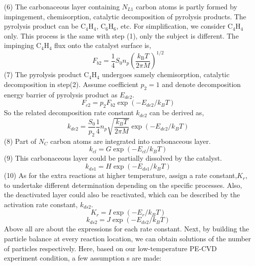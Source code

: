 \noindent (6) The carbonaceous layer containing $N_{L1}$ carbon atoms is partly formed by impingement, chemisorption, catalytic decomposition of pyrolysis products. The pyrolysis product can be $\mathrm{C_{4}H_{4}}$, $\mathrm{C_{6}H_{6}}$, etc. For simpliﬁcation, we consider $\mathrm{C_{4}H_{4}}$ only. This process is the same with step (1), only the subject is different. The impinging  $\mathrm{C_{4}H_{4}}$ flux onto the catalyst surface is,
\begin{equation}
F_{b 2}=\frac{1}{4} S_{0} n_{p}\left(\frac{k_{\mathrm{B}} T}{2 \pi M}\right)^{1 / 2}
\tag{3.2.8}
\end{equation}
(7) The pyrolysis product $\mathrm{C_{4}H_{4}}$ undergoes samely  chemisorption, catalytic decomposition in step(2). Assume coeﬃcient $p_{2}=1$ and denote decomposition energy barrier of pyrolysis product as $E_{de2}$.
\begin{equation}
F_{c 2}=p_{2}F_{b2}\exp \left(-E_{d e 2} / k_{B} T\right)
\tag{3.2.9}
\end{equation}
So the related decomposition rate constant $k_{de2}$ can be derived as,
\begin{equation}
k_{d e 2}=\frac{S_{0}}{p_{2}} \frac{1}{4} n_{p} \sqrt{\frac{k_{B} T}{2 \pi M}} \exp \left(-E_{d e 2} / k_{B} T\right)
\tag{3.2.10}
\end{equation}
(8) Part of $N_{C}$ carbon atoms are integrated into  carbonaceous layer.
\begin{equation}
k_{c l}=G \exp \left(-E_{c l} / k_{B} T\right)
\tag{3.2.11}
\end{equation}
(9) This carbonaceous layer could be partially dissolved by the catalyst.
\begin{equation}
k_{d s 1}=H \exp \left(-E_{d s 1} / k_{B} T\right)
\tag{3.2.12}
\end{equation}
(10) As for the extra reactions at higher temperature, assign a rate constant,$K_{r}$, to undertake diﬀerent determination depending on the specific processes. Also, the deactivated layer could also be reactivated, which can be described by the activation rate constant, $k_{ds2}$. 
\begin{equation}
K_{r}=I\exp \left(-E_{r} / k_{B} T\right)
\tag{3.2.13}
\end{equation}
\begin{equation}
k_{d s 2}=J \exp \left(-E_{d s 2} / k_{B} T\right)
\tag{3.2.14}
\end{equation}
Above all are about the expressions for each rate constant. Next, by building the particle balance at every reaction location, we can obtain solutions of the number of particles respectively. Here, based on our low-temperature PE-CVD experiment condition, a few assumption s are made: 
